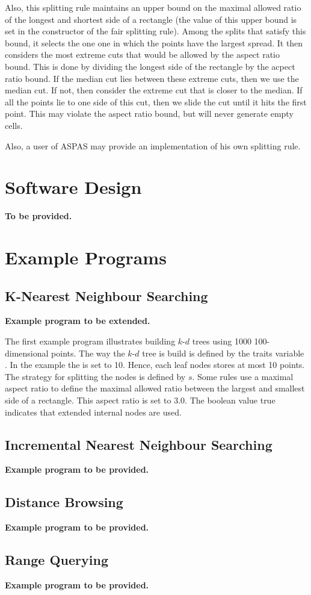 \begin{itemize}
Also, this splitting rule maintains an upper
bound on the maximal allowed ratio of the longest and shortest side of
a rectangle (the value of this upper bound is set in the constructor of the
fair splitting rule). Among the splits that satisfy this bound, it selects
the one one in which the points have the largest spread.
It then considers the most extreme cuts that would be allowed by the
aspect ratio bound. This is done by dividing the longest side of
the rectangle by the acpect ratio bound. If the median cut lies
between these extreme cuts, then we use the median cut. If not,
then consider the extreme cut that is closer to the median.
If all the points lie to one side of this cut, then we slide the cut
until it hits the first point.
This may violate the aspect ratio bound, but will never generate empty cells.

\end{itemize}

Also, a user of ASPAS may provide an implementation of his own
splitting rule.

\section{Software Design}

{\bf To be provided.}

\section{Example Programs}

\subsection{K-Nearest Neighbour Searching}

{\bf Example program to be extended.}

The first example program illustrates building $k$-$d$ trees using 1000
100-dimensional points.
The way the $k$-$d$ tree is build is defined by the traits variable .
In the example the  is set to 10.
Hence, each leaf nodes stores at most 10 points.
The strategy for splitting the nodes is defined by $s$.
Some rules use a maximal aspect ratio to define
the maximal allowed ratio between the largest and smallest side of a rectangle.
This aspect ratio is set to 3.0. The boolean value true indicates that
extended internal nodes are used.


\subsection{Incremental Nearest Neighbour Searching}

{\bf Example program to be provided.}

\subsection{Distance Browsing}

{\bf Example program to be provided.}

\subsection{Range Querying}

{\bf Example program to be provided.}
